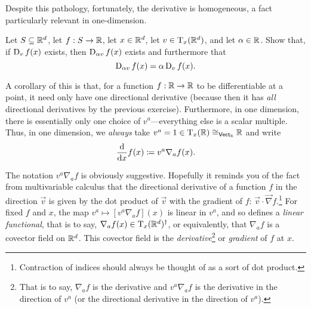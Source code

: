 \begin{dfn}
\begin{savenotes}
\begin{rmk}
Despite this pathology, fortunately, the derivative is homogeneous, a fact particularly relevant in one-dimension.
\end{rmk}
\begin{exr}
Let $S\subseteq \R ^d$, let $f:S\rightarrow \R$, let $x\in \R ^d$, let $v\in \tangent{\R ^d}{x}$, and let $\alpha \in \R$.  Show that, if $\D _vf(x)$ exists, then $\D _{\alpha v}f(x)$ exists and furthermore that
\begin{equation}
\D _{\alpha v}f(x)=\alpha \D _vf(x).
\end{equation}
\end{exr}
\begin{rmk}
A corollary of this is that, for a function $f:\R \rightarrow \R$ to be differentiable at a point, it need only have one directional derivative (because then it has \emph{all} directional derivatives by the previous exercise).  Furthermore, in one dimension, there is essentially only one choice of $v^a$---everything else is a scalar multiple.  Thus, in one dimension, we \emph{always} take $v^a=1\in \tangent{\R}{x}\cong _{\Vect _\R}\R$ and write
\begin{equation}
\frac{\dif}{\dif x}f(x)\coloneqq v^a\nabla _af(x).
\end{equation}
\end{rmk}
\begin{rmk}
The notation $v^a\nabla _af$ is obviously suggestive.  Hopefully it reminds you of the fact from multivariable calculus that the directional derivative of a function $f$ in the direction $\vec{v}$ is given by the dot product of $\vec{v}$ with the gradient of $f$:  $\vec{v}\cdot \vec{\nabla}f$.\footnote{Contraction of indices should always be thought of as a sort of dot product.}  For fixed $f$ and $x$, the map $v^a\mapsto [v^a\nabla _af](x)$ is linear in $v^a$, and so defines a \emph{linear functional}, that is to say, $\nabla _af(x)\in \tangent{\R ^d}{x}^{\dagger}$, or equivalently, that $\nabla _af$ is a covector field on $\R ^d$.  This covector field is the \emph{derivative}\footnote{That is to say, $\nabla _af$ is the derivative and $v^a\nabla _af$ is the derivative in the direction of $v^a$ (or the directional derivative in the direction of $v^a$).} or \emph{gradient} of $f$ at $x$.
\end{rmk}
\begin{rmk}

\end{rmk}
\end{savenotes}
\end{dfn}
